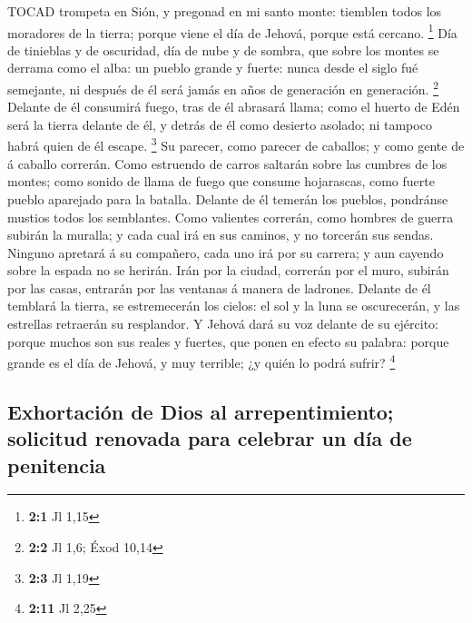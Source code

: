 TOCAD trompeta en Sión, y pregonad en mi santo monte:
tiemblen todos los moradores de la tierra; porque viene el día de
Jehová, porque está cercano. \footnote{\textbf{2:1} Jl 1,15}
 Día de tinieblas y de oscuridad, día de nube y de sombra,
que sobre los montes se derrama como el alba: un pueblo grande y fuerte:
nunca desde el siglo fué semejante, ni después de él será jamás en años
de generación en generación. \footnote{\textbf{2:2} Jl 1,6; Éxod 10,14}
 Delante de él consumirá fuego, tras de él abrasará llama;
como el huerto de Edén será la tierra delante de él, y detrás de él como
desierto asolado; ni tampoco habrá quien de él escape. \footnote{\textbf{2:3}
  Jl 1,19}  Su parecer, como parecer de caballos; y como
gente de á caballo correrán.  Como estruendo de carros
saltarán sobre las cumbres de los montes; como sonido de llama de fuego
que consume hojarascas, como fuerte pueblo aparejado para la batalla.
 Delante de él temerán los pueblos, pondránse mustios todos
los semblantes.  Como valientes correrán, como hombres de
guerra subirán la muralla; y cada cual irá en sus caminos, y no torcerán
sus sendas.  Ninguno apretará á su compañero, cada uno irá
por su carrera; y aun cayendo sobre la espada no se herirán.
 Irán por la ciudad, correrán por el muro, subirán por las
casas, entrarán por las ventanas á manera de ladrones. 
Delante de él temblará la tierra, se estremecerán los cielos: el sol y
la luna se oscurecerán, y las estrellas retraerán su resplandor.
 Y Jehová dará su voz delante de su ejército: porque muchos
son sus reales y fuertes, que ponen en efecto su palabra: porque grande
es el día de Jehová, y muy terrible; ¿y quién lo podrá sufrir?
\footnote{\textbf{2:11} Jl 2,25}

\hypertarget{exhortaciuxf3n-de-dios-al-arrepentimiento-solicitud-renovada-para-celebrar-un-duxeda-de-penitencia}{%
\subsection{Exhortación de Dios al arrepentimiento; solicitud renovada
para celebrar un día de
penitencia}\label{exhortaciuxf3n-de-dios-al-arrepentimiento-solicitud-renovada-para-celebrar-un-duxeda-de-penitencia}}

